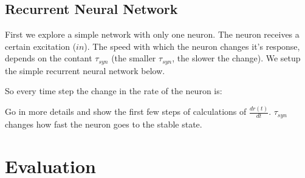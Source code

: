 \section{Recurrent Neural Network} \label{rnnsection}

First we explore a simple network with only one neuron. The neuron receives a certain excitation ($in$). The speed with which the neuron changes it's response, depends on the contant $\tau_{syn}$ (the smaller $\tau_{syn}$, the slower the change). We setup the simple recurrent neural network below.


So every time step the change in the rate of the neuron is:



Go in more details and show the first few steps of calculations of $\frac{dr(t)}{dt}$. $\tau_{syn}$ changes how fast the neuron goes to the stable state.

\chapter{Evaluation}

